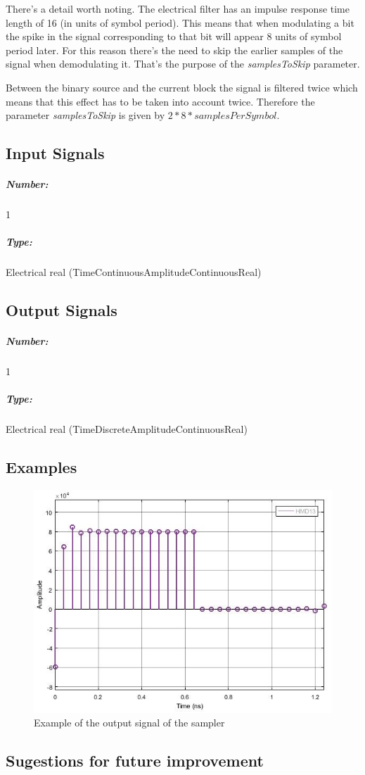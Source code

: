 There's a detail worth noting. The electrical filter has an impulse response time length of 16 (in units of symbol period). This means that when modulating a bit the spike in the signal corresponding to that bit will appear 8 units of symbol period later. For this reason there's the need to skip the earlier samples of the signal when demodulating it. That's the purpose of the \textit{samplesToSkip} parameter.

Between the binary source and the current block the signal is filtered twice which means that this effect has to be taken into account twice. Therefore the parameter \textit{samplesToSkip} is given by $2*8*samplesPerSymbol$. 




\pagebreak

\subsection*{Input Signals}

\subparagraph*{Number:} 1

\subparagraph*{Type:} Electrical real (TimeContinuousAmplitudeContinuousReal)

\subsection*{Output Signals}

\subparagraph*{Number:} 1

\subparagraph*{Type:} Electrical real (TimeDiscreteAmplitudeContinuousReal)

\subsection*{Examples} 

\begin{figure}[h]
	\centering
	\includegraphics[width=\textwidth]{../homodyne_receiver/figures/Sampler_output}
	\caption{Example of the output signal of the sampler}\label{Sampler_output}
\end{figure}

\subsection*{Sugestions for future improvement}
